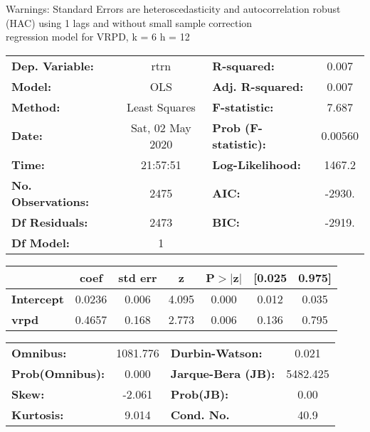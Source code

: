 Warnings: \newline
 [1] Standard Errors are heteroscedasticity and autocorrelation robust (HAC) using 1 lags and without small sample correction\\ 

regression model for VRPD, k = 6 h = 12\begin{center}
\begin{tabular}{lclc}
\toprule
\textbf{Dep. Variable:}    &       rtrn       & \textbf{  R-squared:         } &     0.007   \\
\textbf{Model:}            &       OLS        & \textbf{  Adj. R-squared:    } &     0.007   \\
\textbf{Method:}           &  Least Squares   & \textbf{  F-statistic:       } &     7.687   \\
\textbf{Date:}             & Sat, 02 May 2020 & \textbf{  Prob (F-statistic):} &  0.00560    \\
\textbf{Time:}             &     21:57:51     & \textbf{  Log-Likelihood:    } &    1467.2   \\
\textbf{No. Observations:} &        2475      & \textbf{  AIC:               } &    -2930.   \\
\textbf{Df Residuals:}     &        2473      & \textbf{  BIC:               } &    -2919.   \\
\textbf{Df Model:}         &           1      & \textbf{                     } &             \\
\bottomrule
\end{tabular}
\begin{tabular}{lcccccc}
                   & \textbf{coef} & \textbf{std err} & \textbf{z} & \textbf{P$> |$z$|$} & \textbf{[0.025} & \textbf{0.975]}  \\
\midrule
\textbf{Intercept} &       0.0236  &        0.006     &     4.095  &         0.000        &        0.012    &        0.035     \\
\textbf{vrpd}      &       0.4657  &        0.168     &     2.773  &         0.006        &        0.136    &        0.795     \\
\bottomrule
\end{tabular}
\begin{tabular}{lclc}
\textbf{Omnibus:}       & 1081.776 & \textbf{  Durbin-Watson:     } &    0.021  \\
\textbf{Prob(Omnibus):} &   0.000  & \textbf{  Jarque-Bera (JB):  } & 5482.425  \\
\textbf{Skew:}          &  -2.061  & \textbf{  Prob(JB):          } &     0.00  \\
\textbf{Kurtosis:}      &   9.014  & \textbf{  Cond. No.          } &     40.9  \\
\bottomrule
\end{tabular}
\end{center}

